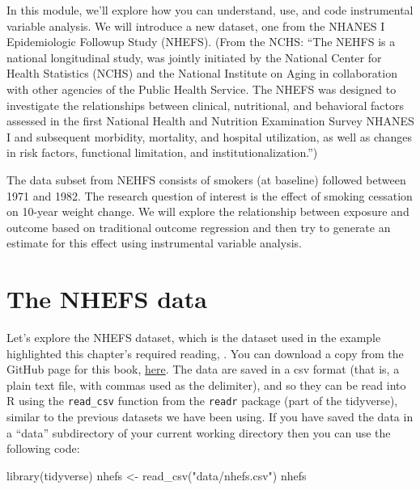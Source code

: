 \documentclass[
]{book}
\newenvironment{Shaded}{\begin{snugshade}}{\end{snugshade}}
\newcommand{\FunctionTok}[1]{\textcolor[rgb]{0.00,0.00,0.00}{#1}}
\newcommand{\NormalTok}[1]{#1}
\newcommand{\OtherTok}[1]{\textcolor[rgb]{0.56,0.35,0.01}{#1}}
\newcommand{\StringTok}[1]{\textcolor[rgb]{0.31,0.60,0.02}{#1}}
\begin{document}
In this module, we'll explore how you can understand, use, and code instrumental
variable analysis. We will introduce a new dataset, one from the NHANES I Epidemiologic Followup Study (NHEFS). (From the NCHS: ``The NEHFS is a national longitudinal study, was jointly initiated by the National Center for Health Statistics (NCHS) and the National Institute on Aging in collaboration with other agencies of the Public Health Service. The NHEFS was designed to investigate the relationships between clinical, nutritional, and behavioral factors assessed in the first National Health and Nutrition Examination Survey NHANES I and subsequent morbidity, mortality, and hospital utilization, as well as changes in risk factors, functional limitation, and institutionalization.'')

The data subset from NEHFS consists of smokers (at baseline) followed between 1971 and 1982. The research question of interest is the effect of smoking cessation on 10-year weight change. We will explore the relationship between exposure and outcome based on traditional outcome regression and then try to generate an estimate for this effect using instrumental variable analysis.

\hypertarget{the-nhefs-data}{%
\section{The NHEFS data}\label{the-nhefs-data}}

Let's explore the NHEFS dataset, which is the dataset used in the example highlighted
this chapter's required reading, \citet{hernanch16}. You can download a copy from the GitHub page for this book, \href{https://github.com/geanders/adv_epi_analysis/blob/master/data/nhefs.csv}{here}. The data are saved in a csv format (that is, a plain text file, with commas used as the delimiter), and so they can be read into R using the \texttt{read\_csv} function from the \texttt{readr} package (part of the tidyverse), similar to the previous datasets we have been using. If you have saved the data in a ``data'' subdirectory of your current working directory then you can use the following code:

\begin{Shaded}
\begin{Highlighting}[]
\FunctionTok{library}\NormalTok{(tidyverse)}
\NormalTok{nhefs }\OtherTok{\textless{}{-}} \FunctionTok{read\_csv}\NormalTok{(}\StringTok{"data/nhefs.csv"}\NormalTok{)}
\NormalTok{nhefs}
\end{Highlighting}
\end{Shaded}
\end{document}
